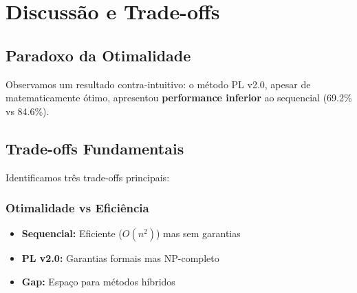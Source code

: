 \documentclass[11pt,a4paper]{article}
\begin{document}
\section{Discussão e Trade-offs}

\subsection{Paradoxo da Otimalidade}

Observamos um resultado contra-intuitivo: o método PL v2.0, apesar de matematicamente ótimo, apresentou \textbf{performance inferior} ao sequencial (69.2\% vs 84.6\%).

\begin{center}
\end{center}

\subsection{Trade-offs Fundamentais}

Identificamos três trade-offs principais:

\subsubsection{Otimalidade vs Eficiência}
\begin{itemize}
    \item \textbf{Sequencial:} Eficiente ($O(n^2)$) mas sem garantias
    \item \textbf{PL v2.0:} Garantias formais mas NP-completo
    \item \textbf{Gap:} Espaço para métodos híbridos
\end{itemize}
\end{document}
